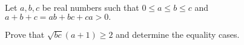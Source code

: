 Let $a,b,c$ be real numbers such that $0 \leq a \leq b \leq c$ and $a+b+c=ab+bc+ca >0.$

Prove that $\sqrt{bc}(a+1) \geq 2$ and determine the equality cases.